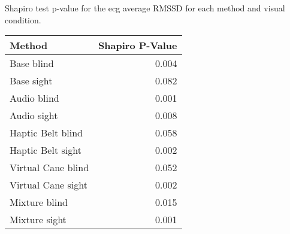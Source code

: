 
\centering
\caption{Shapiro test p-value for the ecg average RMSSD for each method and visual condition.}
\label{tab:shapiro_ecg_rmssd}
\begin{tabular}{lr}
\toprule
            Method &  Shapiro P-Value \\
\midrule
        Base blind &            0.004 \\
        Base sight &            0.082 \\
       Audio blind &            0.001 \\
       Audio sight &            0.008 \\
 Haptic Belt blind &            0.058 \\
 Haptic Belt sight &            0.002 \\
Virtual Cane blind &            0.052 \\
Virtual Cane sight &            0.002 \\
     Mixture blind &            0.015 \\
     Mixture sight &            0.001 \\
\bottomrule
\end{tabular}
